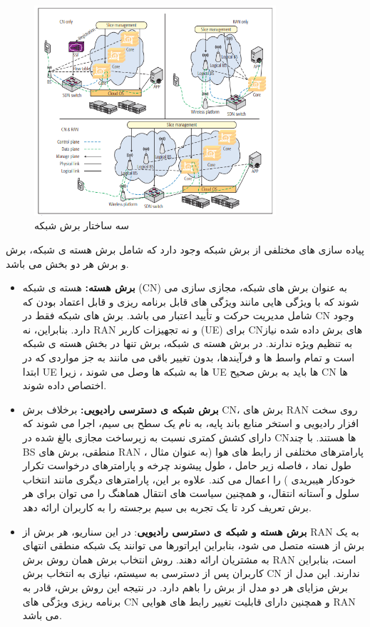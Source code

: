 \begin{figure}
  \centering
    \includegraphics[width=0.8\textwidth]{./fig/NS}
  \caption{سه ساختار برش شبکه \cite{NS2}}
  \label{fig:NS}
\end{figure} 
پیاده سازی های مختلفی از برش شبکه وجود دارد که شامل برش هسته ی شبکه، برش  و برش هر دو بخش می باشد\cite{NS2}.
\begin{itemize}
\item \textbf{برش هسته:}
هسته ی شبکه (CN) 
به عنوان برش های شبکه، مجازی سازی می شوند که با ویژگی هایی مانند ویژگی های قابل برنامه ریزی و قابل اعتماد بودن که شامل مدیریت حرکت و تأیید اعتبار می باشد.
برش های شبکه فقط در CN وجود دارد.
  بنابراین، نه RAN و نه تجهیزات کاربر (UE) برای CNهای برش داده شده نیاز به تنظیم ویژه ندارند.
  در برش هسته ی شبکه، برش تنها در بخش هسته ی شبکه است و تمام واسط ها و فرآیندها، بدون تغییر باقی می مانند
  به جز مواردی که در ابتدا UE ها به شبکه ها وصل می شوند ، زیرا UE ها باید به برش صحیح CN ها اختصاص داده شوند.
\item \textbf{
برش شبکه ی دسترسی رادیویی:
}
برخلاف برش CN،
برش های RAN روی سخت افزار رادیویی و استخر منابع باند پایه، به نام یک سطح بی سیم، اجرا می شوند که دارای کشش کمتری نسبت به زیرساخت مجازی بالغ شده در CNها هستند.
با چند BS منطقی، برش های RAN پارامترهای مختلفی از رابط های هوا (به عنوان مثال ، طول نماد ، فاصله زیر حامل ، طول پیشوند چرخه و پارامترهای درخواست تکرار خودکار هیبریدی ) را اعمال می کند.
علاوه بر این، پارامترهای دیگری مانند انتخاب سلول و آستانه انتقال، و همچنین سیاست های انتقال هماهنگ را می توان برای هر برش تعریف کرد تا یک تجربه بی سیم برجسته را به کاربران ارائه دهد.
\item \textbf{برش هسته و شبکه ی دسترسی رادیویی}:
در این سناریو، هر برش از RAN به یک برش از هسته متصل می شود، بنابراین اپراتورها می توانند یک شبکه منطقی انتهای به مشتریان ارائه دهند.
روش انتخاب برش همان روش برش RAN است، بنابراین کاربران پس از دسترسی به سیستم، نیازی به انتخاب برش CN ندارند.
این مدل از برش مزایای هر دو مدل از برش را باهم دارد.
 در نتیجه این روش برش، قادر به برنامه ریزی ویژگی های CN و همچنین دارای قابلیت تغییر رابط های هوایی RAN
 می باشد.

\end{itemize}
